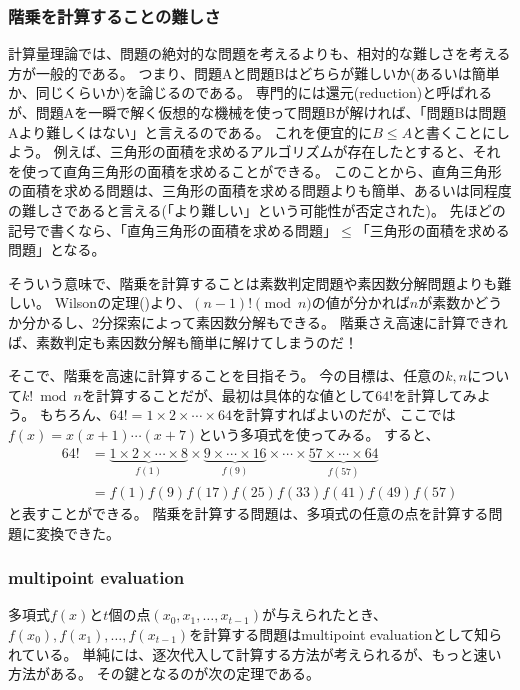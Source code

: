 \subsubsection{階乗を計算することの難しさ}
計算量理論では、問題の絶対的な問題を考えるよりも、相対的な難しさを考える方が一般的である。
つまり、問題Aと問題Bはどちらが難しいか(あるいは簡単か、同じくらいか)を論じるのである。
専門的には還元(reduction)と呼ばれるが、問題Aを一瞬で解く仮想的な機械を使って問題Bが解ければ、「問題Bは問題Aより難しくはない」と言えるのである。
これを便宜的に$B\le A$と書くことにしよう。
例えば、三角形の面積を求めるアルゴリズムが存在したとすると、それを使って直角三角形の面積を求めることができる。
このことから、直角三角形の面積を求める問題は、三角形の面積を求める問題よりも簡単、あるいは同程度の難しさであると言える(「より難しい」という可能性が否定された)。
先ほどの記号で書くなら、「直角三角形の面積を求める問題」$\le$「三角形の面積を求める問題」となる。

そういう意味で、階乗を計算することは素数判定問題や素因数分解問題よりも難しい。
Wilsonの定理()より、$(n-1)!\pmod{n}$の値が分かれば$n$が素数かどうか分かるし、2分探索によって素因数分解もできる。
階乗さえ高速に計算できれば、素数判定も素因数分解も簡単に解けてしまうのだ！

そこで、階乗を高速に計算することを目指そう。
今の目標は、任意の$k,n$について$k! \bmod{n}$を計算することだが、最初は具体的な値として$64!$を計算してみよう。
もちろん、$64!=1\times2\times\cdots\times64$を計算すればよいのだが、ここでは$f(x)=x(x+1)\cdots(x+7)$という多項式を使ってみる。
すると、
\begin{align*}
64! &= \underbrace{ 1 \times 2 \times \cdots \times 8}_{f(1)} \times \underbrace{ 9 \times \cdots \times 16}_{f(9)} \times \cdots \times \underbrace{ 57 \times \cdots \times 64}_{f(57)}\\
 &= f(1)f(9)f(17)f(25)f(33)f(41)f(49)f(57)
\end{align*}
と表すことができる。
階乗を計算する問題は、多項式の任意の点を計算する問題に変換できた。

\subsubsection{multipoint evaluation}
多項式$f(x)$と$t$個の点$(x_0,x_1,\ldots,x_{t-1})$が与えられたとき、$f(x_0),f(x_1),\ldots,f(x_{t-1})$を計算する問題はmultipoint evaluationとして知られている。
単純には、逐次代入して計算する方法が考えられるが、もっと速い方法がある。
その鍵となるのが次の定理である。

